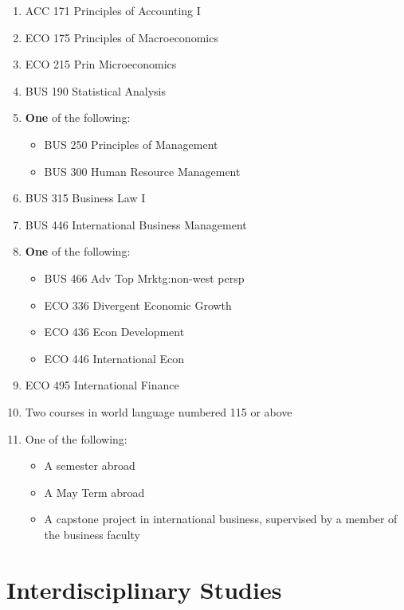 \documentclass[
  letterpaper,
]{scrbook}
\providecommand{\tightlist}{%
  \setlength{\itemsep}{0pt}\setlength{\parskip}{0pt}}
\begin{document}
\begin{enumerate}
\def\labelenumi{\arabic{enumi}.}
\tightlist
\item
  ACC 171 Principles of Accounting I
\item
  ECO 175 Principles of Macroeconomics
\item
  ECO 215 Prin Microeconomics
\item
  BUS 190 Statistical Analysis
\item
  \textbf{One} of the following:

  \begin{itemize}
  \tightlist
  \item
    BUS 250 Principles of Management
  \item
    BUS 300 Human Resource Management
  \end{itemize}
\item
  BUS 315 Business Law I
\item
  BUS 446 International Business Management
\item
  \textbf{One} of the following:

  \begin{itemize}
  \tightlist
  \item
    BUS 466 Adv Top Mrktg:non-west persp
  \item
    ECO 336 Divergent Economic Growth
  \item
    ECO 436 Econ Development
  \item
    ECO 446 International Econ
  \end{itemize}
\item
  ECO 495 International Finance
\item
  Two courses in world language numbered 115 or above
\item
  One of the following:

  \begin{itemize}
  \tightlist
  \item
    A semester abroad
  \item
    A May Term abroad
  \item
    A capstone project in international business, supervised by a member
    of the business faculty
  \end{itemize}
\end{enumerate}

\section{Interdisciplinary Studies}\label{sec-interdisciplinary-studies}
\end{document}
